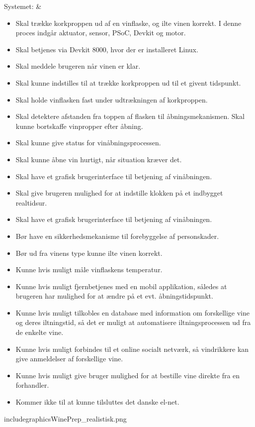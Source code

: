 Systemet: & \begin{itemize}
	\item Skal trække korkproppen ud af en vinflaske, og ilte vinen korrekt. I denne proces indgår aktuator, sensor, PSoC, Devkit og motor.
	\item Skal betjenes via Devkit 8000, hvor der er installeret Linux.
	\item Skal meddele brugeren når vinen er klar.
	\item Skal kunne indstilles til at trække korkproppen ud til et givent tidspunkt.
	\item Skal holde vinflasken fast under udtrækningen af korkproppen.
	\item Skal detektere afstanden fra toppen af flasken til åbningsmekanismen.
	Skal kunne bortskaffe vinpropper efter åbning.
	\item Skal kunne give status for vinåbningsprocessen.
	\item Skal kunne åbne vin hurtigt, når situation kræver det.
	\item Skal have et grafisk brugerinterface til betjening af vinåbningen.
	\item Skal give brugeren mulighed for at indstille klokken på et indbygget realtidsur.
	\item Skal have et grafisk brugerinterface til betjening af vinåbningen.
	\item Bør have en sikkerhedsmekanisme til forebyggelse af personskader.
	\item Bør ud fra vinens type kunne ilte vinen korrekt.
	\item Kunne hvis muligt måle vinflaskens temperatur.
	\item Kunne hvis muligt fjernbetjenes med en mobil applikation, således at brugeren har mulighed for at ændre på et evt. åbningstidspunkt.
	\item Kunne hvis muligt tilkobles en database med information om forskellige vine og deres iltningstid, så det er muligt at automatisere iltningsprocessen ud fra de enkelte vine.
	\item Kunne hvis muligt forbindes til et online socialt netværk, så vindrikkere kan give anmeldelser af forskellige vine.
	\item Kunne hvis muligt give bruger mulighed for at bestille vine direkte fra en forhandler.
	\item Kommer ikke til at kunne tilsluttes det danske el-net.
\end{itemize}

\begin{center}
	includegraphics{WinePrep_realistisk.png}
\end{center}
